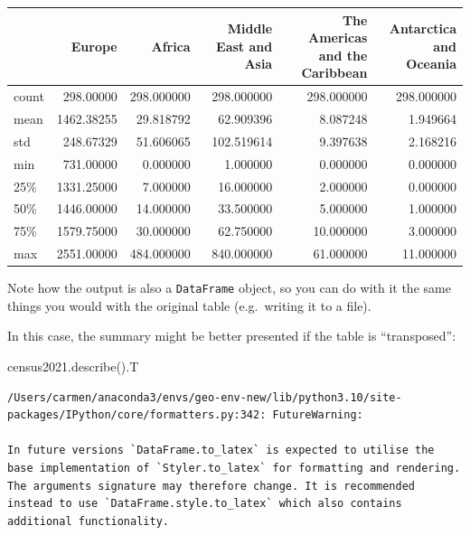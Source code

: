 \documentclass[
  letterpaper,
  DIV=11,
  numbers=noendperiod]{scrreprt}
\newenvironment{Shaded}{\begin{snugshade}}{\end{snugshade}}
\newcommand{\NormalTok}[1]{\textcolor[rgb]{0.00,0.23,0.31}{#1}}
\begin{document}
\begin{tabular}{lrrrrr}
\toprule
{} &      Europe &      Africa &  Middle East and Asia &  The Americas and the Caribbean &  Antarctica and Oceania \\
\midrule
count &   298.00000 &  298.000000 &            298.000000 &                      298.000000 &              298.000000 \\
mean  &  1462.38255 &   29.818792 &             62.909396 &                        8.087248 &                1.949664 \\
std   &   248.67329 &   51.606065 &            102.519614 &                        9.397638 &                2.168216 \\
min   &   731.00000 &    0.000000 &              1.000000 &                        0.000000 &                0.000000 \\
25\%   &  1331.25000 &    7.000000 &             16.000000 &                        2.000000 &                0.000000 \\
50\%   &  1446.00000 &   14.000000 &             33.500000 &                        5.000000 &                1.000000 \\
75\%   &  1579.75000 &   30.000000 &             62.750000 &                       10.000000 &                3.000000 \\
max   &  2551.00000 &  484.000000 &            840.000000 &                       61.000000 &               11.000000 \\
\bottomrule
\end{tabular}

Note how the output is also a \texttt{DataFrame} object, so you can do
with it the same things you would with the original table (e.g.~writing
it to a file).

In this case, the summary might be better presented if the table is
``transposed'':

\begin{Shaded}
\begin{Highlighting}[]
\NormalTok{census2021.describe().T}
\end{Highlighting}
\end{Shaded}

\begin{verbatim}
/Users/carmen/anaconda3/envs/geo-env-new/lib/python3.10/site-packages/IPython/core/formatters.py:342: FutureWarning:

In future versions `DataFrame.to_latex` is expected to utilise the base implementation of `Styler.to_latex` for formatting and rendering. The arguments signature may therefore change. It is recommended instead to use `DataFrame.style.to_latex` which also contains additional functionality.
\end{verbatim}
\end{document}
